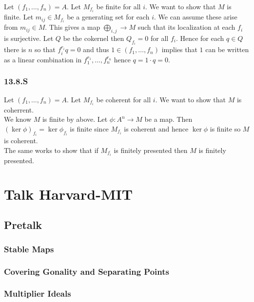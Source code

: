 \documentclass[12pt]{article}
\theoremstyle{plain}
\begin{document}
Let $(f_1, \dots, f_n) = A$. Let $M_{f_i}$ be finite for all $i$. We want to show that $M$ is finite. Let $m_{ij} \in M_{f_i}$ be a generating set for each $i$. We can assume these arise from $m_{ij} \in M$. This gives a map $\bigoplus_{i,j} \to M$ such that its localization at each $f_i$ is surjective. Let $Q$ be the cokernel then $Q_{f_i} = 0$ for all $f_i$. Hence for each $q \in Q$ there is $n$ so that $f_i^{r_i} q = 0$ and thus $1 \in (f_1, \dots, f_n)$ implies that $1$ can be written as a linear combination in $f_1^{r_1}, \dots, f_n^{r_n}$ hence $q = 1 \cdot q = 0$.


\subsubsection{13.8.S}

Let $(f_1, \dots, f_n) = A$. Let $M_{f_i}$ be coherent for all $i$. We want to show that $M$ is coherrent. 
\bigskip\\
We know $M$ is finite by above. Let $\phi : A^n \to M$ be a map. Then $(\ker{\phi})_{f_i} = \ker{\phi_{f_i}}$ is finite since $M_{f_i}$ is coherent and hence $\ker{\phi}$ is finite so $M$ is coherent.
\bigskip\\
The same works to show that if $M_{f_i}$ is finitely presented then $M$ is finitely presented. 
 
 
 


\section{Talk Harvard-MIT}

\subsection{Pretalk}

\subsubsection{Stable Maps}

\subsubsection{Covering Gonality and Separating Points}

\subsubsection{Multiplier Ideals}
\end{document}
